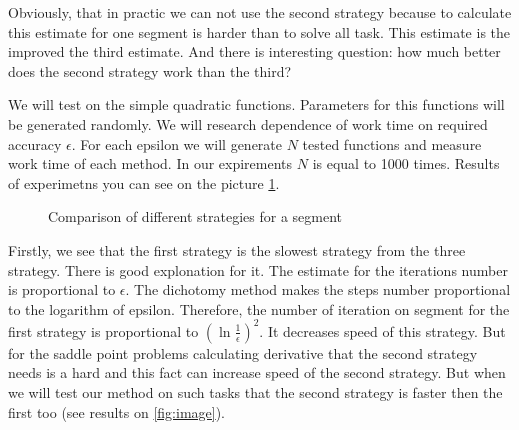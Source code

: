 \documentclass[12pt]{article}
\begin{document}
Obviously, that in practic we can not use the second strategy because to calculate this estimate for one segment is harder than to solve all task. This estimate is the improved the third estimate. And there is interesting question: how much better does the second strategy work than the third?

We will test on the simple quadratic functions. Parameters for this functions will be generated randomly. We will research dependence of work time on required accuracy $\epsilon$. For each epsilon we will generate $N$ tested functions and measure work time of each method. In our expirements $N$ is equal to 1000 times. Results of experimetns you can see on the picture \ref{res}.

\begin{figure}[h!]
\label{res}
 \caption{Comparison of different strategies for a segment}
\end{figure}

Firstly, we see that the first strategy is the slowest strategy from the three strategy. There is good explonation for it. The estimate for the iterations number is proportional to $\epsilon$. The dichotomy method makes the steps number proportional to the logarithm of epsilon. Therefore, the number of iteration on segment for the first strategy is proportional to $(\ln \frac{1}{\epsilon})^2$. It decreases speed of this strategy. But for the saddle point problems calculating derivative that the second strategy needs is a hard and this fact can increase speed of the second strategy. But when we will test our method on such tasks that the second strategy is faster then the first too (see results on \ref{fig:image}).
\end{document}
